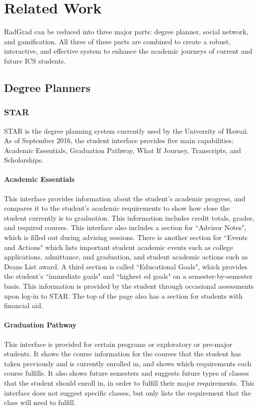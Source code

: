 \chapter{Related Work}
RadGrad can be reduced into three major parts: degree planner, social network, and gamification. All three of these parts are combined to create a robust, interactive, and effective system to enhance the academic journeys of current and future ICS students. 
\section{Degree Planners}
\subsection{STAR}
STAR is the degree planning system currently used by the University of Hawaii. As of September 2016, the student interface provides five main capabilities: Academic Essentials, Graduation Pathway, What If Journey, Transcripts, and Scholarships. 

\subsubsection{Academic Essentials}
This interface provides information about the student's academic progress, and compares it to the student's academic requirements to show how close the student currently is to graduation. This information includes credit totals, grades, and required courses. This interface also includes a section for ``Advisor Notes", which is filled out during advising sessions. There is another section for ``Events and Actions" which lists important student academic events such as college applications, admittance, and graduation, and student academic actions such as Deans List award. A third section is called ``Educational Goals", which provides the student's ``immediate goals" and ``highest ed goals" on a semester-by-semester basis. This information is provided by the student through occasional assessments upon log-in to STAR. The top of the page also has a section for students with financial aid.
\subsubsection{Graduation Pathway}
This interface is provided for certain programs or exploratory or pre-major students. It shows the course information for the courses that the student has taken previously and is currently enrolled in, and shows which requirements each course fulfills. It also shows future semesters and suggests future types of classes that the student should enroll in, in order to fulfill their major requirements. This interface does not suggest specific classes, but only lists the requirement that the class will need to fulfill. 
